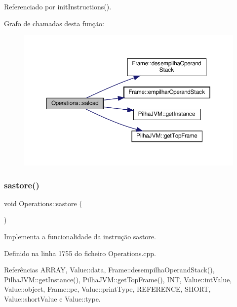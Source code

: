 Referenciado por init\+Instructions().

Grafo de chamadas desta função\+:
\nopagebreak
\begin{figure}[H]
\begin{center}
\leavevmode
\includegraphics[width=350pt]{classOperations_ac97743869c458c3ffcda48383308e9b4_cgraph}
\end{center}
\end{figure}
\mbox{\label{classOperations_aab1c34c455478d75c21cdb06d6c94172}} 
\subsubsection{\texorpdfstring{sastore()}{sastore()}}
{\footnotesize\ttfamily void Operations\+::sastore (\begin{DoxyParamCaption}{ }\end{DoxyParamCaption})\hspace{0.3cm}{\ttfamily [private]}}



Implementa a funcionalidade da instrução sastore. 



Definido na linha 1755 do ficheiro Operations.\+cpp.



Referências A\+R\+R\+AY, Value\+::data, Frame\+::desempilha\+Operand\+Stack(), Pilha\+J\+V\+M\+::get\+Instance(), Pilha\+J\+V\+M\+::get\+Top\+Frame(), I\+NT, Value\+::int\+Value, Value\+::object, Frame\+::pc, Value\+::print\+Type, R\+E\+F\+E\+R\+E\+N\+CE, S\+H\+O\+RT, Value\+::short\+Value e Value\+::type.



